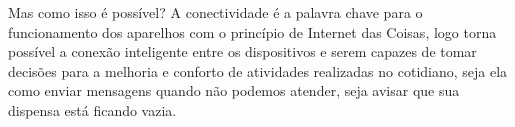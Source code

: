 \documentclass[11pt]{classe_cn}                 %
\begin{document}
Mas como isso é possível? A conectividade é a palavra chave para o 
funcionamento dos aparelhos com o princípio de Internet das Coisas, 
logo torna possível a conexão inteligente entre os dispositivos e 
serem capazes de tomar decisões para a melhoria e conforto de 
atividades realizadas no cotidiano, seja ela como enviar mensagens 
quando não podemos atender, seja avisar que sua dispensa está ficando vazia.



\vspace{1.0cm}





\end{document}
